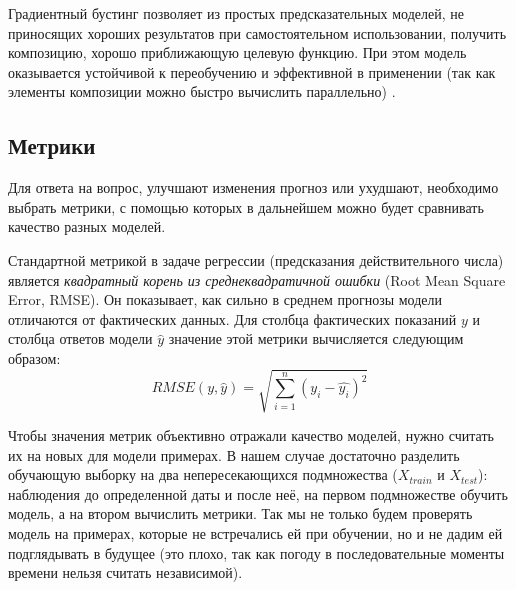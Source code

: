 \documentclass[14pt]{matmex-diploma}
\begin{document}
Градиентный бустинг позволяет из простых предсказательных моделей, не приносящих хороших результатов при самостоятельном использовании, получить композицию, хорошо приближающую целевую функцию. При этом модель оказывается устойчивой к переобучению и эффективной в применении (так как элементы композиции можно быстро вычислить параллельно) \cite{FRIEDMAN2002367}.





\subsection{Метрики}
Для ответа на вопрос, улучшают изменения прогноз или ухудшают, необходимо выбрать метрики, с помощью которых в дальнейшем можно будет сравнивать качество разных моделей.

Стандартной метрикой в задаче регрессии (предсказания действительного числа) является \textit{квадратный корень из среднеквадратичной ошибки} (Root Mean Square Error, RMSE). Он показывает, как сильно в среднем прогнозы модели отличаются от фактических данных. Для столбца фактических показаний $y$ и столбца ответов модели $\hat{y}$ значение этой метрики вычисляется следующим образом:
        $$RMSE(y, \hat{y}) = \sqrt{\sum^{n}_{i=1}{(y_i - \hat{y_i})^2}}$$


Чтобы значения метрик объективно отражали качество моделей, нужно считать их на новых для модели примерах. В нашем случае достаточно разделить обучающую выборку на два непересекающихся подмножества ($X_{train}$ и $X_{test}$): наблюдения до определенной даты и после неё, на первом подмножестве обучить модель, а на втором вычислить метрики. Так мы не только будем проверять модель на примерах, которые не встречались ей при обучении, но и не дадим ей подглядывать в будущее (это плохо, так как погоду в последовательные моменты времени нельзя считать независимой).  
\end{document}

